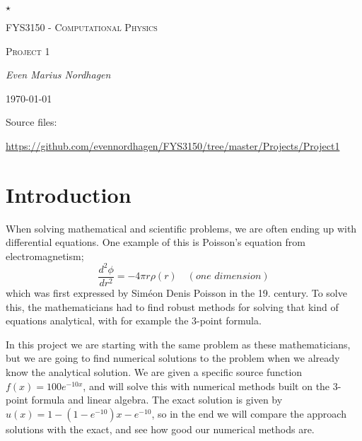\documentclass{scrartcl}
\begin{document}
\begin{titlepage}
	\centering
	{\scshape\LARGE $\star$  \par}
	\vspace{4cm}
	{\scshape\huge FYS3150 - Computational Physics  \par}
	\vspace{1cm}
	{\scshape\Large Project 1\par}
	\vspace{2cm}
	{\Large\itshape Even Marius Nordhagen\par}
	\vfill
	{\large \today\par}
\end{titlepage}
\newpage
\begin{abstract}
\subsection*{Abstract}
In this project we are finding the second derivative for a function by the 3-point formula and numerical methods, counting the number of floating point operation (FLOPS) and taking the GPU time for each of the methods. The result was that LU decomposition generated most FLOPS and had longest running time compared with Gaussian elimination, as expected.
\end{abstract}%

\par Source files:
\par \url{https://github.com/evennordhagen/FYS3150/tree/master/Projects/Project1}

\section{Introduction}
When solving mathematical and scientific problems, we are often ending up with differential equations. One example of this is Poisson's equation from electromagnetism;
$$\frac{d^2\phi}{dr^2}=-4\pi r\rho(r)\quad(one\,\,dimension)$$
which was first expressed by Sim\'{e}on Denis Poisson in the 19. century. To solve this, the mathematicians had to find robust methods for solving that kind of equations analytical, with for example the 3-point formula. \par\vspace{2mm} In this project we are starting with the same problem as these mathematicians, but we are going to find numerical solutions to the problem when we already know the analytical solution. We are given a specific source function $f(x)=100e^{-10x}$, and will solve this with numerical methods built on the 3-point formula and linear algebra. The exact solution is given by $u(x)=1-(1-e^{-10})x-e^{-10}$, so in the end we will compare the approach solutions with the exact, and see how good our numerical methods are.
\end{document}
